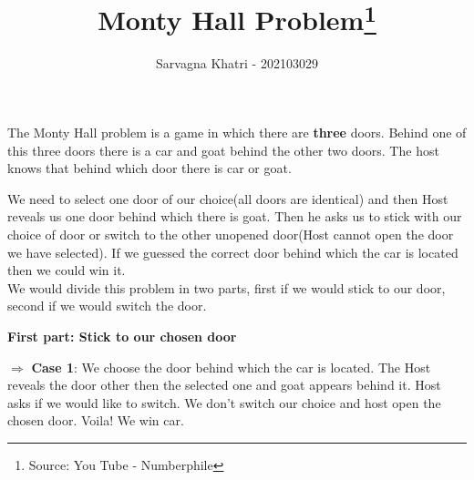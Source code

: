 \documentclass{beamer}
\title{Monty Hall Problem\footnote[1]{Source: You Tube - Numberphile}}
\author{Sarvagna Khatri - 202103029}
\begin{document}
\begin{frame}
    \titlepage 
\end{frame}

The Monty Hall problem is a game in which there are \textbf{three} doors.
Behind one of this three doors there is a car and goat behind the other two doors. The host knows that behind which door there is car or goat.\\
\begin{figure}
    \begin{center}
    
    
    \end{center}
    
   
    
\end{figure}



 We need to select one door of our choice(all doors are identical) and then Host reveals us one door behind which there is goat. Then he asks us to stick with our choice of door or switch to the other unopened door(Host cannot open the door we have selected). If we guessed the correct door behind which the car is located then we could win it.\\
 


We would divide this problem in two parts, first if we would stick to our door, second if we would switch the door.\\
\clearpage

\begin{center}
\textbf{First part: Stick to our chosen door}
\end{center}

$\Rightarrow$ \textbf{Case 1}: We choose the door behind which the car is located. The Host reveals the door other then the selected one and goat appears behind it. Host asks if we would like to switch. We don't switch our choice and host open the chosen door. Voila! We win car.
\begin{figure}
\begin{center}
    

   \end{center}
\end{figure}
\clearpage
\end{document}
